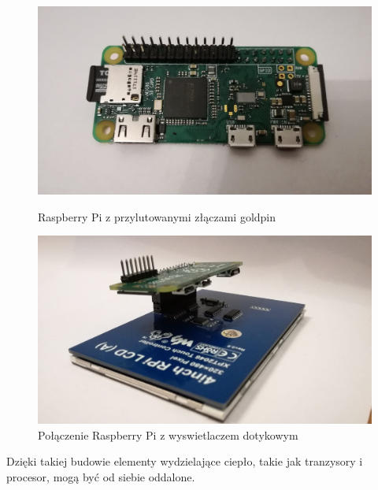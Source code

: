 \documentclass[12pt, eng, twoside, openany, final]{mgr}
\begin{document}
       
        \begin{figure}[!h]
        	\centering
        	\begin{minipage}[t]{5cm}
        		\centering
        		\includegraphics[scale=0.1]{rpi_goldpin.jpg}
        		\caption{Raspberry Pi z przylutowanymi złączami goldpin} \label{fig:rpi1} 
        	\end{minipage}
        	\hspace{3cm}
        	\begin{minipage}[t]{5cm}
        		\centering
        		\includegraphics[scale=0.1]{rpi_lcd.jpg}
        		\caption{Połączenie Raspberry Pi z wyswietlaczem dotykowym} \label{fig:rpi_lcd} 
        	\end{minipage}
        \end{figure}
        Dzięki takiej budowie elementy wydzielające ciepło, takie jak tranzysory i procesor, mogą być od siebie oddalone. 
        \newpage
        
\end{document}
